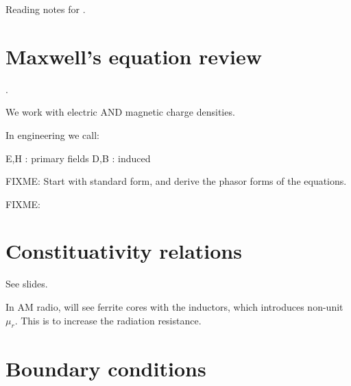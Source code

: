 %
%

\renewcommand{\basename}{chapter3Notes}
\renewcommand{\dirname}{notes/ece1229/}



\usepackage{ece1229}

\beginArtNoToc


Reading notes for  \citep{balanis2005antenna}.

%
%

\section{Maxwell's equation review}.

We work with electric AND magnetic charge densities.

In engineering we call:

E,H : primary fields
D,B : induced

FIXME: Start with standard form, and derive the phasor forms of the equations.


FIXME: 
\section{Constituativity relations}

See slides.

In AM radio, will see ferrite cores with the inductors, which introduces non-unit \( \mu_r \).  This is to increase the radiation resistance.

\section{Boundary conditions}

